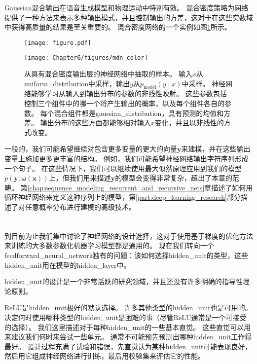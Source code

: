 
Gaussian混合输出在语音生成模型\citep{schuster1999supervised}和物理运动\citep{Graves-arxiv2013}中特别有效。
混合密度策略为网络提供了一种方法来表示多种输出模式，并且控制输出的方差，这对于在这些实数域中获得高质量的结果是至关重要的。
混合密度网络的一个实例如图\ref{fig:chap6_mdn_color}所示。
\begin{figure}[!htb]
\ifOpenSource
\centerline{\texttt{[image: figure.pdf]}}
\else
\centerline{\texttt{[image: Chapter6/figures/mdn\_color]}}
\fi
\captionsetup{singlelinecheck=off}
\caption{从具有混合密度输出层的神经网络中抽取的样本。
输入$x$从\gls{uniform_distribution}中采样，输出$y$从$p_{\text{model}}(y\mid x)$中采样。 神经网络能够学习从输入到输出分布的参数的非线性映射。 这些参数包括控制三个组件中的哪一个将产生输出的概率，以及每个组件各自的参数。
每个混合组件都是\gls{gaussian_distribution}，具有预测的均值和方差。 输出分布的这些方面都能够相对输入$x$变化，并且以非线性的方式改变。}
\label{fig:chap6_mdn_color}
\end{figure}


一般的，我们可能希望继续对包含更多变量的更大的向量$\bm{y}$来建模，并在这些输出变量上施加更多更丰富的结构。
例如，我们可能希望神经网络输出字符序列形成一个句子。
在这些情况下，我们可以继续使用最大似然原理应用到我们的模型$p(\bm{y};\bm{\omega}(\bm{x}))$上，但我们用来描述$\bm{y}$的模型会变得非常复杂，超出了本章的范畴。
第\ref{chap:sequence_modeling_recurrent_and_recursive_nets}章描述了如何用循环神经网络来定义这种序列上的模型，第\ref{part:deep_learning_research}部分描述了对任意概率分布进行建模的高级技术。

\section{}
\label{sec:hidden_units}

到目前为止我们集中讨论了神经网络的设计选择，这对于使用基于梯度的优化方法来训练的大多数参数化机器学习模型都是通用的。
现在我们转向一个\gls{feedforward_neural_network}独有的问题：该如何选择\gls{hidden_unit}的类型，这些\gls{hidden_unit}用在模型的\gls{hidden_layer}中。


\gls{hidden_unit}的设计是一个非常活跃的研究领域，并且还没有许多明确的指导性理论原则。

\gls{ReLU}是\gls{hidden_unit}极好的默认选择。
许多其他类型的\gls{hidden_unit}也是可用的。
决定何时使用哪种类型的\gls{hidden_unit}是困难的事（尽管\gls{ReLU}通常是一个可接受的选择）。
我们这里描述对于每种\gls{hidden_unit}的一些基本直觉。
这些直觉可以用来建议我们何时来尝试一些单元。
通常不可能预先预测出哪种\gls{hidden_unit}工作得最好。
设计过程充满了试验和错误，先直觉认为某种\gls{hidden_unit}可能表现良好，然后用它组成神经网络进行训练，最后用校验集来评估它的性能。

